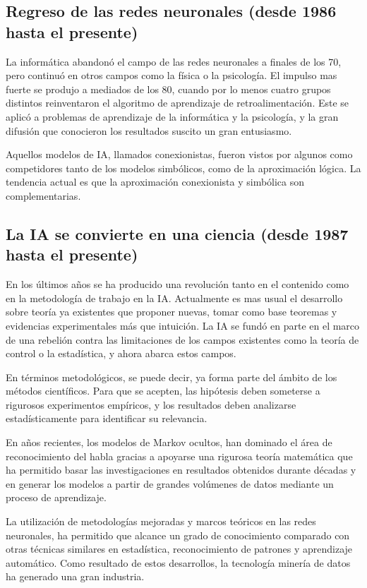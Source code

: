 \documentclass[12pt,a4paper]{article}
\begin{document}
\subsection{Regreso de las redes neuronales (desde 1986 hasta el presente)}
La informática abandonó el campo de las redes neuronales a finales de los 70, pero continuó en otros campos como la física o la psicología. El impulso mas fuerte se produjo a mediados de los 80, cuando por lo menos cuatro grupos distintos reinventaron el algoritmo de aprendizaje de retroalimentación. Este se aplicó a problemas de aprendizaje de la informática y la psicología, y la gran difusión que conocieron los resultados suscito un gran entusiasmo.

Aquellos modelos de IA, llamados conexionistas, fueron vistos por algunos como competidores tanto de los modelos simbólicos, como de la aproximación lógica. La tendencia actual es que la aproximación conexionista y simbólica son complementarias.

\subsection{La IA se convierte en una ciencia (desde 1987 hasta el presente)}
En los últimos años se ha producido una revolución tanto en el contenido como en la metodología de trabajo en la IA. Actualmente es mas usual el desarrollo sobre teoría ya existentes que proponer nuevas, tomar como base teoremas y evidencias experimentales más que intuición. La IA se fundó en parte en el marco de una rebelión contra las limitaciones de los campos existentes como la teoría de control o la estadística, y ahora abarca estos campos.

En términos metodológicos, se puede decir, ya forma parte del ámbito de los métodos científicos. Para que se acepten, las hipótesis deben someterse a rigurosos experimentos empíricos, y los resultados deben analizarse estadísticamente para identificar su relevancia.

En años recientes, los modelos de Markov ocultos, han dominado el área de reconocimiento del habla gracias a apoyarse una rigurosa teoría matemática que ha permitido basar las investigaciones en resultados obtenidos durante décadas y en generar los modelos a partir de grandes volúmenes de datos mediante un proceso de aprendizaje.

La utilización de metodologías mejoradas y marcos teóricos en las redes neuronales, ha permitido que alcance un grado de conocimiento comparado con otras técnicas similares en estadística, reconocimiento de patrones y aprendizaje automático. Como resultado de estos desarrollos, la tecnología minería de datos ha generado una gran industria.
\end{document}
